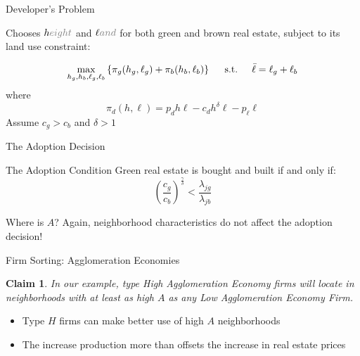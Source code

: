 \documentclass[11pt, dvipsnames, usenames]{beamer}
\newtheorem{claim}[theorem]{Claim}
\begin{document}
\begin{frame}{Developer's Problem}

Chooses $h\textcolor{gray}{eight}$ and $\ell\textcolor{gray}{and}$ for both green and brown real estate, subject to its land use constraint:

\vfill
$$\max_{h_g, h_b, \ell_g, \ell_b} \left\{ \pi_g(h_g, \ell_g) + \pi_b(h_b, \ell_b)\right\} \hspace{.5cm}\text{s.t.}\hspace{.5cm} \bar{\ell} = \ell_g + \ell_b$$ 
where
$$\pi_d(h, \ell) = p_d h\ell - c_d h^\delta \ell - p_\ell \ell$$
\vfill
Assume $c_g > c_b$ and $\delta > 1$ 

\end{frame}



\begin{frame}{The Adoption Decision}

\begin{block}{The Adoption Condition}
Green real estate is bought and built if and only if:
$$\left(\frac{c_g}{c_b}\right)^\frac{\gamma}{\delta} < \frac{\lambda_{jg}}{\lambda_{jb}}$$
\end{block}

\vfill
Where is $A$? Again, neighborhood characteristics do not affect the adoption decision!

\end{frame}


\begin{frame}{Firm Sorting: Agglomeration Economies}

\begin{claim}
In our example, type High Agglomeration Economy firms will locate in neighborhoods with at least as high $A$ as any Low Agglomeration Economy Firm.
\end{claim}

\vfill
\begin{itemize}
\item Type $H$ firms can make better use of high $A$ neighborhoods
\item The increase production more than offsets the increase in real estate prices
\end{itemize}

\end{frame}
\end{document}
